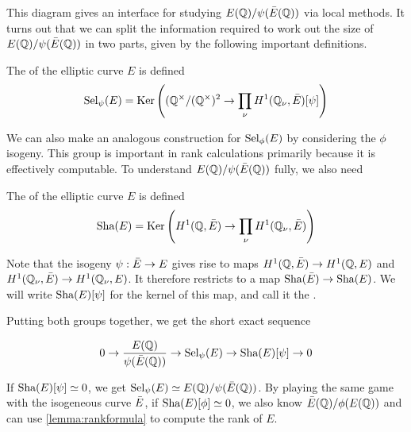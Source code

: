 \documentclass[12pt, a4paper]{report}
\begin{document}

This diagram gives an interface for studying $E({\mathbb Q})/\psi(\bar{E}({\mathbb Q}))$ via
local methods. It turns out that we can split the information required to work
out the size of $E({\mathbb Q})/\psi(\bar{E}({\mathbb Q}))$ in two parts, given by the following
important definitions.

\begin{defn}
  The  of the elliptic curve $E$ is defined
  $$\text{\normalfont Sel}_\psi(E) = \text{Ker}\left(({\mathbb Q}^{\times}/({\mathbb Q}^{\times})^2 \rightarrow
  \prod\limits_\nu H^1({\mathbb Q}_\nu, \bar{E})[\psi]\right)$$
\end{defn}

We can also make an analogous construction for $\text{\normalfont Sel}_\phi(E)$ by
considering the $\phi$ isogeny. 
This group is important in rank calculations primarily because it is effectively
computable. To understand $E({\mathbb Q})/\psi(\bar{E}({\mathbb Q}))$ fully, we also need

\begin{defn} \label{defn:sha}
  The  of the elliptic curve $E$ is defined
  $$ \text{\normalfont Sha}(E) = \text{Ker} 
  \left(H^1({\mathbb Q}, \bar{E}) \rightarrow \prod\limits_\nu H^1 ({\mathbb Q}_\nu,
  \bar{E})\right) $$
\end{defn}
Note that the isogeny $\psi: \bar{E} \rightarrow E$ gives rise to maps $H^1({\mathbb Q},
\bar{E}) \rightarrow H^1({\mathbb Q},E)$ and $H^1({\mathbb Q}_\nu, \bar{E}) \rightarrow H^1({\mathbb Q}_\nu, E)$. It
therefore restricts to a map $\text{\normalfont Sha}(\bar{E}) \rightarrow \text{\normalfont Sha}(E)$. We will write
$\text{\normalfont Sha}(E)[\psi]$ for the kernel of this map, and call it the
.

Putting both groups together, we get the short exact sequence

\[ 0 \rightarrow \frac{E({\mathbb Q})}{\psi(\bar{E}({\mathbb Q}))} \rightarrow \text{\normalfont Sel}_\psi(E) \rightarrow \text{\normalfont Sha}(E)[\psi]
  \rightarrow 0\]

If $\text{\normalfont Sha}(E)[\psi] \simeq 0$, we get
$\text{\normalfont Sel}_\psi(E) \simeq E({\mathbb Q})/\psi(\bar{E}({\mathbb Q}))$. By playing
the same game with the isogeneous curve $\bar{E}$, if $\text{\normalfont Sha}(E)[\phi] \simeq 0$,
we also know $\bar{E}({\mathbb Q})/\phi(E({\mathbb Q}))$ and can use \ref{lemma:rankformula} to compute
the rank of $E$. 
\end{document}
